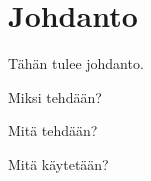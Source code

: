 \chapter{Johdanto}%
\label{ch:johdanto}

Tähän tulee johdanto.

Miksi tehdään?

Mitä tehdään?

Mitä käytetään?
